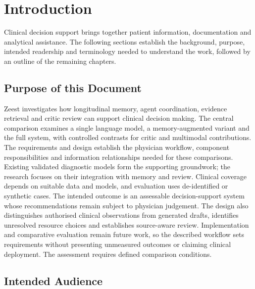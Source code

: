 \begingroup
\renewcommand{\encodingdefault}{T1}
\selectfont
\chapter{Introduction}

Clinical decision support brings together patient information, documentation and analytical assistance. The following sections establish the background, purpose, intended readership and terminology needed to understand the work, followed by an outline of the remaining chapters.

\section{Purpose of this Document}

Zeest investigates how longitudinal memory, agent coordination, evidence retrieval and critic review can support clinical decision making. The central comparison examines a single language model, a memory-augmented variant and the full system, with controlled contrasts for critic and multimodal contributions. The requirements and design establish the physician workflow, component responsibilities and information relationships needed for these comparisons. Existing validated diagnostic models form the supporting groundwork; the research focuses on their integration with memory and review. Clinical coverage depends on suitable data and models, and evaluation uses de-identified or synthetic cases. The intended outcome is an assessable decision-support system whose recommendations remain subject to physician judgement. The design also distinguishes authorised clinical observations from generated drafts, identifies unresolved resource choices and establishes source-aware review. Implementation and comparative evaluation remain future work, so the described workflow sets requirements without presenting unmeasured outcomes or claiming clinical deployment. The assessment requires defined comparison conditions.

\section{Intended Audience}


